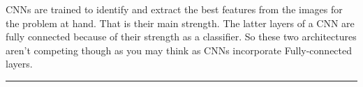 \documentclass[11pt]{article}
\begin{document}
CNNs are trained to identify and extract the best features from the
images for the problem at hand. That is their main strength. The latter
layers of a CNN are fully connected because of their strength as a
classifier. So these two architectures aren't competing though as you
may think as CNNs incorporate Fully-connected layers.

    \begin{center}\rule{0.5\linewidth}{\linethickness}\end{center}


    
    
    
    
\end{document}
